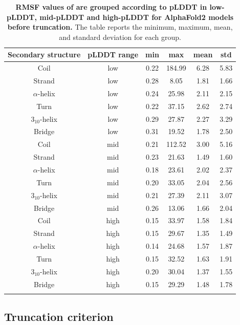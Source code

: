 
\begin{table}[H]
\small
\centering
\caption{\textbf{RMSF values of are grouped according to pLDDT in low-pLDDT, mid-pLDDT and high-pLDDT for AlphaFold2 models before truncation.} The table reports the minimum, maximum, mean, and standard deviation for each group.}
\label{tab:plddt_sup:suptable4}
\begin{tabular}{cccccc}
\toprule
Secondary structure & pLDDT range & min & max & mean & std \\ \midrule
Coil           & low& 0.22  & 184.99 & 6.28 & 5.83 \\
Strand         & low& 0.28 & 8.05   & 1.81 & 1.66 \\
$\alpha$-helix& low
& 0.24 & 25.98   & 2.11 & 2.15 \\
Turn           & low& 0.22 & 37.15   & 2.62 & 2.74 \\
$3_{10}$-helix& low
& 0.29 & 27.87   & 2.27 & 3.29 \\
Bridge         & low& 0.31 & 19.52   & 1.78 & 2.50 \\
\arrayrulecolor[gray]{0.8}\hline
Coil           & mid& 0.21 & 112.52  & 3.00 & 5.16 \\
Strand         & mid& 0.23  & 21.63  & 1.49 & 1.60\\
$\alpha$-helix& mid& 0.18  & 23.61  & 2.02 & 2.37 \\
Turn           & mid& 0.20  & 33.05  & 2.04 & 2.56 \\
$3_{10}$-helix& mid& 0.21  & 27.39  & 2.11 & 3.07 \\
Bridge         & mid& 0.26  & 13.06  & 1.66 & 2.04 \\
\arrayrulecolor[gray]{0.8}\hline
Coil           & high& 0.15  & 33.97  & 1.58 & 1.84 \\
Strand         & high& 0.15  & 29.67  & 1.35 & 1.49 \\
$\alpha$-helix& high& 0.14  & 24.68  & 1.57 & 1.87 \\
Turn           & high& 0.15  & 32.52  & 1.63 & 1.91 \\
$3_{10}$-helix& high& 0.20  & 30.04  & 1.37 & 1.55 \\
Bridge         & high& 0.15  & 29.29  & 1.48 & 1.78 \\ \arrayrulecolor{black} \bottomrule
\end{tabular}
\end{table}



\subsection*{Truncation criterion}\label{section:supNMA:truncation}

